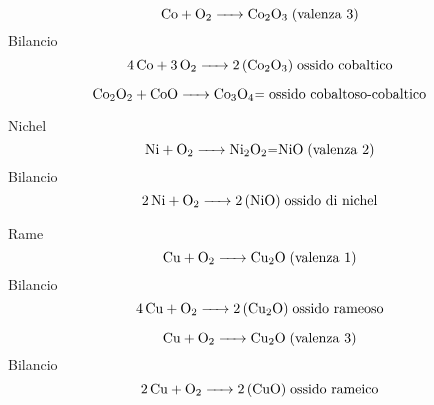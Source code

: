 $$\ce{ Co + O_2 -> Co_2O_3} \; \text{(valenza 3)}$$ Bilancio
$$\ce{ 4 Co + 3 O_2 -> 2 (Co_2O_3)} \; \text{ossido cobaltico}$$

$$\ce{ Co_2O_2 + CoO -> Co_3O_4=} \; \text{ossido cobaltoso-cobaltico}$$

Nichel
$$\ce{ Ni + O_2 -> Ni_2O_2=NiO} \; \text{(valenza 2)}$$ Bilancio
$$\ce{ 2 Ni + O_2 -> 2 (NiO)} \; \text{ossido di nichel}$$

Rame
$$\ce{ Cu + O_2 -> Cu_2O} \; \text{(valenza 1)}$$ Bilancio
$$\ce{ 4 Cu + O_2 -> 2 (Cu_2O)} \; \text{ossido rameoso}$$

$$\ce{ Cu + O_2 -> Cu_2O} \; \text{(valenza 3)}$$ Bilancio
$$\ce{ 2 Cu + O_2 -> 2 (CuO)} \; \text{ossido rameico}$$